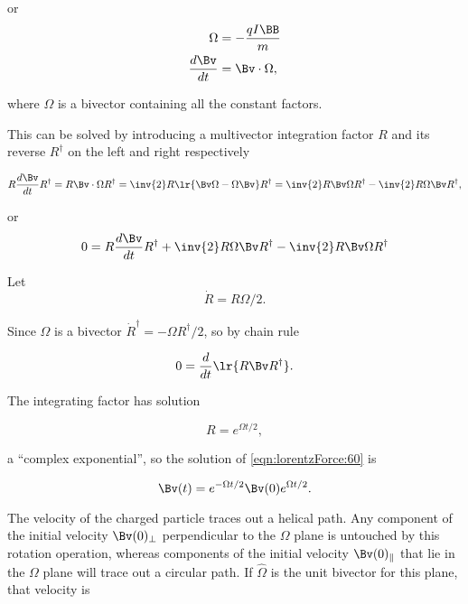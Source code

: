 or
\begin{dmath}\label{eqn:lorentzForce:80}
\begin{aligned}
\Omega &= -\frac{q I \BB}{m} \\
\frac{d\Bv}{dt} &= \Bv \cdot \Omega,
\end{aligned}
\end{dmath}

where \( \Omega \) is a bivector containing all the constant factors.

This can be solved by introducing a multivector integration factor \( R \) and its reverse \( R^\dagger \) on the left and right respectively

\begin{dmath}\label{eqn:lorentzForce:100}
R \frac{d\Bv}{dt} R^\dagger
= R \Bv \cdot \Omega R^\dagger
= \inv{2} R \lr{ \Bv \Omega - \Omega \Bv} R^\dagger
= \inv{2} R \Bv \Omega R^\dagger - \inv{2} R \Omega \Bv R^\dagger,
\end{dmath}

or
\begin{dmath}\label{eqn:lorentzForce:120}
0 =
R \frac{d\Bv}{dt} R^\dagger
+ \inv{2} R \Omega \Bv R^\dagger
- \inv{2} R \Bv \Omega R^\dagger
\end{dmath}

Let
\begin{dmath}\label{eqn:lorentzForce:140}
\dot{R} = R \Omega/2.
\end{dmath}

Since \( \Omega \) is a bivector \( \dot{R}^\dagger = -\Omega R^\dagger/2 \), so by chain rule

\begin{dmath}\label{eqn:lorentzForce:160}
0
=
\frac{d}{dt} \lr{
R \Bv R^\dagger
}.
\end{dmath}

The integrating factor has solution

\begin{dmath}\label{eqn:lorentzForce:180}
R = e^{\Omega t/2},
\end{dmath}

a ``complex exponential'', so the solution of \cref{eqn:lorentzForce:60} is

\begin{dmath}\label{eqn:lorentzForce:200}
\Bv(t) = e^{-\Omega t/2} \Bv(0) e^{\Omega t/2}.
\end{dmath}

The velocity of the charged particle traces out a helical path.
Any component of the initial velocity \( \Bv(0)_\perp \) perpendicular to the \( \Omega \) plane is untouched by this rotation operation, whereas components of the initial velocity \( \Bv(0)_\parallel \) that lie in the \( \Omega \) plane will trace out a circular path.  
If \( \hat{\Omega} \) is the unit bivector for this plane, that velocity is

